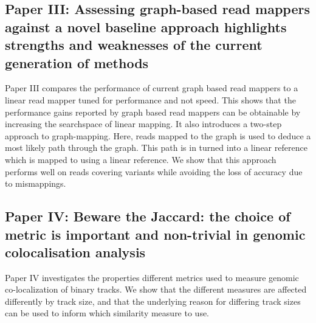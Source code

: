\subsection*{Paper III: Assessing graph-based read mappers against a novel baseline approach highlights strengths and weaknesses of the current generation of methods}
Paper III compares the performance of current graph based read mappers to a linear read mapper tuned for performance and not speed.
This shows that the performance gains reported by graph based read mappers can be obtainable by increasing the searchspace of linear mapping.
It also introduces a two-step approach to graph-mapping.
Here, reads mapped to the graph is used to deduce a most likely path through the graph. This path is in turned into a linear reference which is mapped to using a linear reference.
We show that this approach performs well on reads covering variants while avoiding the loss of accuracy due to mismappings.

\subsection*{Paper IV: Beware the Jaccard: the choice of metric is important and non-trivial in genomic colocalisation analysis}
Paper IV investigates the properties different metrics used to measure genomic co-localization of binary tracks.
We show that the different measures are affected differently by track size, and that the underlying reason for differing track sizes can be used to inform which similarity measure to use.

